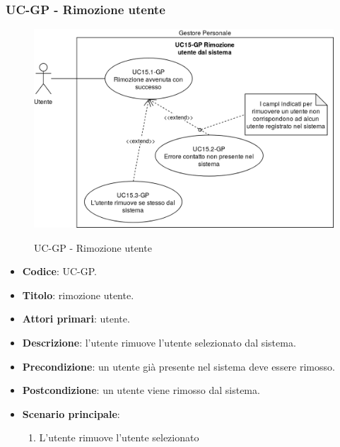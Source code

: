 \subsubsection{UC\theuccount-GP - Rimozione utente}
		\begin{figure}[H]
			\centering
				\includegraphics[width=\columnwidth]{img/casi_d'uso/UC15.png}\\
			\caption{UC\theuccount-GP - Rimozione utente}
		\end{figure}
	\begin{itemize}
		\item \textbf{Codice}: UC\theuccount-GP.
		\item \textbf{Titolo}: rimozione utente.
		\item \textbf{Attori primari}: utente.
		\item \textbf{Descrizione}: l'utente rimuove l'utente selezionato dal sistema.
		\item \textbf{Precondizione}: un utente già presente nel sistema deve essere rimosso.
		\item \textbf{Postcondizione}: un utente viene rimosso dal sistema.
		\item \textbf{Scenario principale}:
		\begin{enumerate}
			\item L'utente rimuove l'utente selezionato
		\end{enumerate}
\end{itemize}
	
